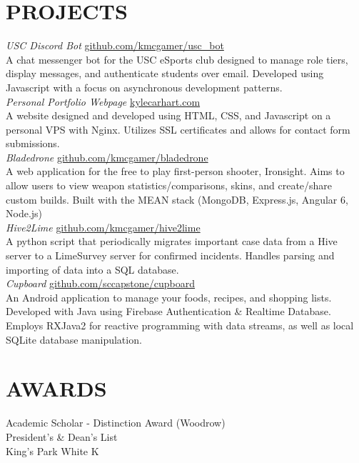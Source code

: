 \documentclass[line,margin]{res}
\begin{document}
\begin{resume}
\section{PROJECTS} {\sl USC Discord Bot} \hfill \href{https://www.github.com/kmcgamer/usc_bot}{github.com/kmcgamer/usc\_bot} \\
				A chat messenger bot for the USC eSports club designed to manage role tiers, display messages, and authenticate students over email. Developed using Javascript with a focus on asynchronous development patterns. \\[5pt]
				{\sl Personal Portfolio Webpage} \hfill \href{https://www.kylecarhart.com}{kylecarhart.com} \\
				A website designed and developed using HTML, CSS, and Javascript on a personal VPS with Nginx. Utilizes SSL certificates and allows for contact form submissions.\\[5pt]
				{\sl Bladedrone} \hfill \href{https://www.github.com/kmcgamer/bladedrone}{github.com/kmcgamer/bladedrone} \\
				A web application for the free to play first-person shooter, Ironsight. Aims to allow users to view weapon statistics/comparisons, skins, and create/share custom builds. Built with the MEAN stack (MongoDB, Express.js, Angular 6, Node.js)\\[5pt]
				{\sl Hive2Lime} \hfill \href{https://www.github.com/kmcgamer/hive2lime}{github.com/kmcgamer/hive2lime} \\
				A python script that periodically migrates important case data from a Hive server to a LimeSurvey server for confirmed incidents. Handles parsing and importing of data into a SQL database.\\[5pt]
				{\sl Cupboard} \hfill \href{https://www.github.com/sccapstone/cupboard}{github.com/sccapstone/cupboard} \\
				An Android application to manage your foods, recipes, and shopping lists. Developed with Java using Firebase Authentication \& Realtime Database. Employs RXJava2 for reactive programming with data streams, as well as local SQLite database manipulation.
 
\section{AWARDS}Academic Scholar - Distinction Award (Woodrow) \\
				President's \& Dean's List \\  
				King's Park White K


\end{resume}
\end{document}
